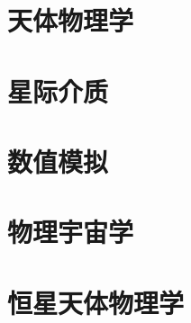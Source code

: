 \documentclass[UTF8]{NatureUniverse}
\begin{document}
\section{天体物理学}
\section{星际介质}
\section{数值模拟}
\section{物理宇宙学}
\section{恒星天体物理学}
\end{document}
